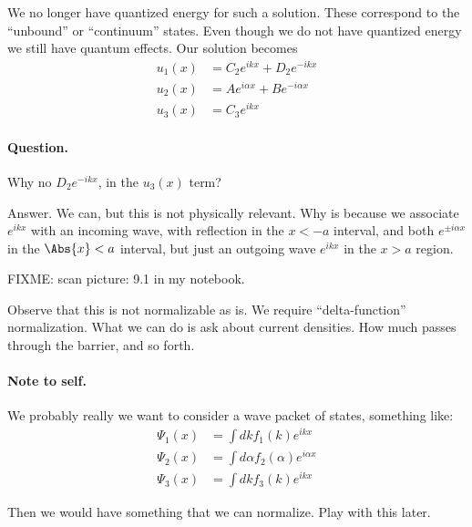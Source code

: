 {We no longer have quantized energy for such a solution.  These correspond to the ``unbound'' or ``continuum'' states.  Even though we do not have quantized energy we still have quantum effects.  Our solution becomes
%
\begin{equation}\label{eqn:lecture9boundStates:320}
\begin{aligned}
u_1(x) &=
C_2 e^{i k x}
+D_2 e^{-i k x}  \\
u_2(x) &=
A e^{i \alpha x}
+B e^{-i \alpha x}  \\
u_3(x) &=
C_3 e^{i k x}
\end{aligned}
\end{equation}

\paragraph{Question.}  Why no \(D_2 e^{-i k x}\), in the \(u_3(x)\) term?

Answer.  We can, but this is not physically relevant.  Why is because we associate \(e^{ikx}\) with an incoming wave, with reflection in the \(x < -a\) interval, and both \(e^{\pm i \alpha x}\) in the \(\Abs{x} < a\) interval, but just an outgoing wave \(e^{i k x}\) in the \(x > a\) region.

FIXME: scan picture: 9.1 in my notebook.

Observe that this is not normalizable as is.  We require ``delta-function'' normalization.  What we can do is ask about current densities.  How much passes through the barrier, and so forth.


\paragraph{Note to self.}
We probably really we want to consider a wave packet of states, something like:
%
\begin{equation}\label{eqn:lecture9boundStates:340}
\begin{aligned}
\Psi_1(x) &= \int dk f_1(k) e^{i k x} \\
\Psi_2(x) &= \int d\alpha f_2(\alpha) e^{i \alpha x} \\
\Psi_3(x) &= \int dk f_3(k) e^{i k x}
\end{aligned}
\end{equation}

Then we would have something that we can normalize.  Play with this later.

} %
